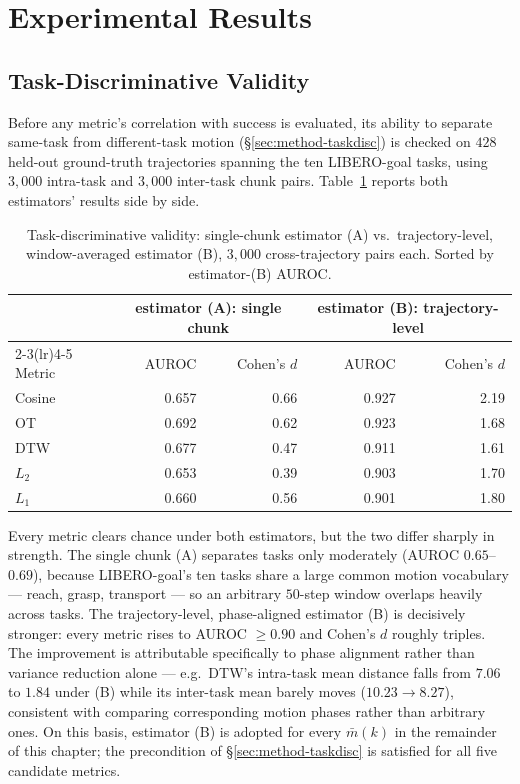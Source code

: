 \documentclass[11pt]{article}
\numberwithin{equation}{section}
\numberwithin{table}{section}
\numberwithin{figure}{section}
\begin{document}
\section{Experimental Results}
\label{sec:results}

\subsection{Task-Discriminative Validity}
\label{sec:results-taskdisc}

Before any metric's correlation with success is evaluated, its ability to separate same-task from
different-task motion (\S\ref{sec:method-taskdisc}) is checked on $428$ held-out ground-truth
trajectories spanning the ten LIBERO-goal tasks, using $3{,}000$ intra-task and $3{,}000$ inter-task
chunk pairs. Table~\ref{tab:taskdisc} reports both estimators' results side by side.

\begin{table}[h]
\centering
\caption{Task-discriminative validity: single-chunk estimator (A) vs.\ trajectory-level, window-averaged
estimator (B), $3{,}000$ cross-trajectory pairs each. Sorted by estimator-(B) AUROC.}
\label{tab:taskdisc}
\begin{tabular}{lrrrr}
\toprule
 & \multicolumn{2}{c}{estimator (A): single chunk} & \multicolumn{2}{c}{estimator (B): trajectory-level} \\
\cmidrule(lr){2-3}\cmidrule(lr){4-5}
Metric & AUROC & Cohen's $d$ & AUROC & Cohen's $d$ \\
\midrule
Cosine    & 0.657 & 0.66 & 0.927 & 2.19 \\
OT        & 0.692 & 0.62 & 0.923 & 1.68 \\
DTW       & 0.677 & 0.47 & 0.911 & 1.61 \\
$L_2$     & 0.653 & 0.39 & 0.903 & 1.70 \\
$L_1$     & 0.660 & 0.56 & 0.901 & 1.80 \\
\bottomrule
\end{tabular}
\end{table}

Every metric clears chance under both estimators, but the two differ sharply in strength. The single
chunk (A) separates tasks only moderately (AUROC $0.65$--$0.69$), because LIBERO-goal's ten tasks share a
large common motion vocabulary --- reach, grasp, transport --- so an arbitrary $50$-step window overlaps
heavily across tasks. The trajectory-level, phase-aligned estimator (B) is decisively stronger: every
metric rises to AUROC $\ge0.90$ and Cohen's $d$ roughly triples. The improvement is attributable
specifically to phase alignment rather than variance reduction alone --- e.g.\ DTW's intra-task mean
distance falls from $7.06$ to $1.84$ under (B) while its inter-task mean barely moves ($10.23\to8.27$),
consistent with comparing corresponding motion phases rather than arbitrary ones. On this basis,
estimator (B) is adopted for every $\bar m(k)$ in the remainder of this chapter; the precondition of
\S\ref{sec:method-taskdisc} is satisfied for all five candidate metrics.
\end{document}
